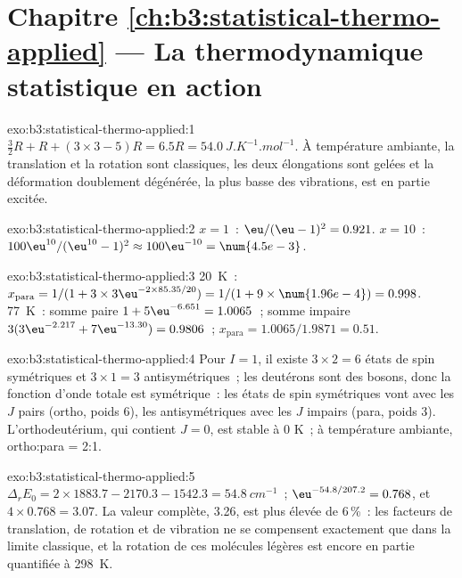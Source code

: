\section*{Chapitre \ref{ch:b3:statistical-thermo-applied} --- La thermodynamique statistique en action}

\begin{solution}{exo:b3:statistical-thermo-applied:1}
$\frac32R + R + (3 \times 3 - 5)R = 6.5R = \qty{54.0}{J.K^{-1}.mol^{-1}}$.
À température ambiante, la translation et la rotation sont classiques,
les deux élongations sont gelées et la déformation doublement dégénérée,
la plus basse des vibrations, est en partie excitée.
\end{solution}

\begin{solution}{exo:b3:statistical-thermo-applied:2}
$x = 1$~: $\eu/(\eu - 1)^2 = 0.921$. $x = 10$~: $100\eu^{10}/(\eu^{10} - 1)^2 \approx 100\eu^{-10} = \num{4.5e-3}$.
\end{solution}

\begin{solution}{exo:b3:statistical-thermo-applied:3}
\qty{20}{K}~: $x_{\mathrm{para}} = 1/(1 + 3 \times 3\eu^{-2 \times 85.35/20}) = 1/(1 + 9 \times \num{1.96e-4}) = 0.998$.
\qty{77}{K}~: somme paire $1 + 5\eu^{-6.651} = 1.0065$~; somme impaire $3(3\eu^{-2.217} + 7\eu^{-13.30}) = 0.9806$~;
$x_{\mathrm{para}} = 1.0065/1.9871 = 0.51$.
\end{solution}

\begin{solution}{exo:b3:statistical-thermo-applied:4}
Pour $I = 1$, il existe $3 \times 2 = 6$ états de spin symétriques et
$3 \times 1 = 3$ antisymétriques~;
les deutérons sont des bosons, donc la fonction d'onde totale est
symétrique~: les états de spin symétriques vont avec les $J$ pairs
(ortho, poids 6), les antisymétriques avec les $J$ impairs (para,
poids 3). L'orthodeutérium, qui contient $J = 0$, est stable à 0 K~; à
température ambiante, ortho:para = 2:1.
\end{solution}

\begin{solution}{exo:b3:statistical-thermo-applied:5}
$\Delta_rE_0 = 2 \times 1883.7 - 2170.3 - 1542.3 = \qty{54.8}{cm^{-1}}$~; $\eu^{-54.8/207.2} = 0.768$, et
$4 \times 0.768 = 3.07$. La valeur complète, 3.26, est plus élevée de
6\,\%~: les facteurs de translation, de rotation et de vibration ne se
compensent exactement que dans la limite classique, et la rotation de
ces molécules légères est encore en partie quantifiée à \qty{298}{K}.
\end{solution}

